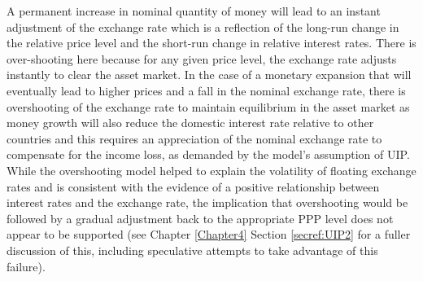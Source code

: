 \documentclass[12pt, a4paper, oneside]{article}\usepackage[]{graphicx}\usepackage[]{color}
\begin{document}
A permanent increase in nominal quantity of money will lead to an instant adjustment of the exchange rate which is a reflection of the long-run change in the relative price level and the short-run change in relative interest rates.  There is over-shooting here because for any given price level, the exchange rate adjusts instantly to clear the asset market.  In the case of a monetary expansion that will eventually lead to higher prices and a fall in the nominal exchange rate, there is overshooting of the exchange rate to maintain equilibrium in the asset market as money growth will also reduce the domestic interest rate relative to other countries and this requires an appreciation of the nominal exchange rate to compensate for the income loss, as demanded by the model's assumption of UIP.  While the overshooting model helped to explain the volatility of floating exchange rates and is consistent with the evidence of a positive relationship between interest rates and the exchange rate, the implication that overshooting would be followed by a gradual adjustment back to the appropriate PPP level does not appear to be supported (see Chapter \ref{Chapter4} Section \ref{secref:UIP2} for a fuller discussion of this, including speculative attempts to take advantage of this failure).    
\end{document}
